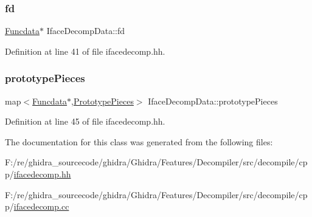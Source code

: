 \mbox{\label{class_iface_decomp_data_a6448c8594d5fc954dd79f896f449e058}} 
\subsubsection{\texorpdfstring{fd}{fd}}
{\footnotesize\ttfamily \mbox{\hyperlink{class_funcdata}{Funcdata}}$\ast$ Iface\+Decomp\+Data\+::fd}



Definition at line 41 of file ifacedecomp.\+hh.

\mbox{\label{class_iface_decomp_data_ad29fbdde2fc92deabfb3eaeac2425d41}} 
\subsubsection{\texorpdfstring{prototypePieces}{prototypePieces}}
{\footnotesize\ttfamily map$<$\mbox{\hyperlink{class_funcdata}{Funcdata}}$\ast$,\mbox{\hyperlink{struct_prototype_pieces}{Prototype\+Pieces}}$>$ Iface\+Decomp\+Data\+::prototype\+Pieces}



Definition at line 45 of file ifacedecomp.\+hh.



The documentation for this class was generated from the following files\+:\begin{DoxyCompactItemize}
\item 
F\+:/re/ghidra\+\_\+sourcecode/ghidra/\+Ghidra/\+Features/\+Decompiler/src/decompile/cpp/\mbox{\hyperlink{ifacedecomp_8hh}{ifacedecomp.\+hh}}\item 
F\+:/re/ghidra\+\_\+sourcecode/ghidra/\+Ghidra/\+Features/\+Decompiler/src/decompile/cpp/\mbox{\hyperlink{ifacedecomp_8cc}{ifacedecomp.\+cc}}\end{DoxyCompactItemize}

